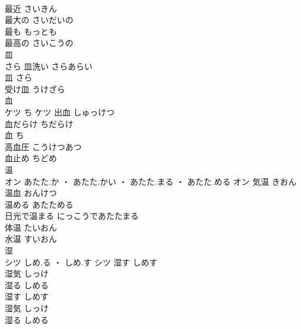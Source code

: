 \documentclass[8pt]{extreport}
\begin{document}
\begin{CJK}{UTF8}{min}
\\	最近	さいきん	
\\	最大の	さいだいの	
\\	最も	もっとも	
\\	最高の	さいこうの	
\\	皿	
\\	さら		皿洗い	さらあらい	
\\	皿	さら	
\\	受け皿	うけざら	
\\	血	
\\	ケツ	ち	ケツ	出血	しゅっけつ	
\\	血だらけ	ちだらけ	
\\	血	ち	
\\	高血圧	こうけつあつ	
\\	血止め	ちどめ	
\\	温	
\\	オン	あたた.か ・ あたた.かい ・ あたた.まる ・ あたた.める	オン	気温	きおん	
\\	温血	おんけつ	
\\	温める	あたためる	
\\	日光で温まる	にっこうであたたまる	
\\	体温	たいおん	
\\	水温	すいおん	
\\	湿	
\\	シツ	しめ.る ・ しめ.す	シツ	湿す	しめす	
\\	湿気	しっけ	
\\	湿る	しめる	
\\	湿す	しめす	
\\	湿気	しっけ	
\\	湿る	しめる	
\end{CJK}
\end{document}

